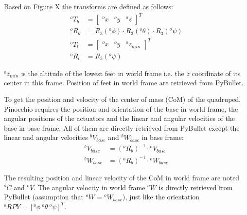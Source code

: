 \documentclass[a4paper,11pt]{article}
\begin{document}
Based on Figure X the transforms are defined as follows: 
\begin{align}
{}^o\!T_b &= \begin{bmatrix} {}^o\!x & {}^o\!y & {}^o\!z \end{bmatrix}^T \\
{}^o\!R_b &= R_3({}^o\phi) \cdot R_3({}^o\theta) \cdot R_3({}^o\psi) \\
{}^o\!T_l &= \begin{bmatrix} {}^o\!x & {}^o\!y & {}^o\!z_{min} \end{bmatrix}^T \label{eq:oMl_T}\\ 
{}^o\!R_l &= R_3({}^o\psi) \label{eq:oMl_R}
\end{align}


${}^o\!z_{min}$ is the altitude of the lowest feet in world frame i.e. the $z$ coordinate of its center in this frame. Position of feet in world frame are retrieved from PyBullet.

 
To get the position and velocity of the center of mass (CoM) of the quadruped, Pinocchio requires the position and orientation of the base in world frame, the angular positions of the actuators and the linear and angular velocities of the base in base frame. All of them are directly retrieved from PyBullet except the linear and angular velocities ${}^b\!V_{base}$ and ${}^b\!W_{base}$ in base frame: %
\begin{align}
{}^bV_{base} &= ({}^o\!R_b)^{-1} \cdot {}^oV_{base} \\
{}^bW_{base} &= ({}^o\!R_b)^{-1} \cdot {}^oW_{base}
\end{align}  

The resulting position and linear velocity of the CoM in world frame are noted ${}^o\!C$ and ${}^o\!V$. The angular velocity in world frame ${}^oW$ is directly retrieved from PyBullet (assumption that ${}^oW = {}^oW_{base}$), just like the orientation ${}^o\!RPY = [{}^o\!\phi ~ {}^o\!\theta ~ {}^o\!\psi]^T$.
\end{document}
